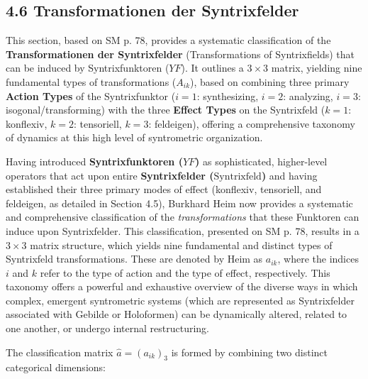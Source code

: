 \documentclass[12pt]{article}
\newcommand{\syntrixfeld}{\text{Syntrixfeld}}
\newcommand{\syntrixfunktor}{YF}
\begin{document}
\subsection{4.6 Transformationen der Syntrixfelder}
\label{sec:syntrixfeld_transformationen}

This section, based on SM p. 78, provides a systematic classification of the \textbf{Transformationen der Syntrixfelder} (Transformations of Syntrixfields) that can be induced by Syntrixfunktoren (\(\syntrixfunktor\)). It outlines a \(3 \times 3\) matrix, yielding nine fundamental types of transformations (\(A_{ik}\)), based on combining three primary \textbf{Action Types} of the Syntrixfunktor (\(i=1\): synthesizing, \(i=2\): analyzing, \(i=3\): isogonal/transforming) with the three \textbf{Effect Types} on the Syntrixfeld (\(k=1\): konflexiv, \(k=2\): tensoriell, \(k=3\): feldeigen), offering a comprehensive taxonomy of dynamics at this high level of syntrometric organization.

Having introduced \textbf{Syntrixfunktoren (\( \syntrixfunktor \))} as sophisticated, higher-level operators that act upon entire \textbf{Syntrixfelder (\(\syntrixfeld\))} and having established their three primary modes of effect (konflexiv, tensoriell, and feldeigen, as detailed in Section 4.5), Burkhard Heim now provides a systematic and comprehensive classification of the \textit{transformations} that these Funktoren can induce upon Syntrixfelder. This classification, presented on SM p. 78, results in a \( 3 \times 3 \) matrix structure, which yields nine fundamental and distinct types of Syntrixfeld transformations. These are denoted by Heim as \( a_{ik} \), where the indices \(i\) and \(k\) refer to the type of action and the type of effect, respectively. This taxonomy offers a powerful and exhaustive overview of the diverse ways in which complex, emergent syntrometric systems (which are represented as Syntrixfelder associated with Gebilde or Holoformen) can be dynamically altered, related to one another, or undergo internal restructuring.

The classification matrix \( \hat{a} = (a_{ik})_3 \) is formed by combining two distinct categorical dimensions:
\end{document}
